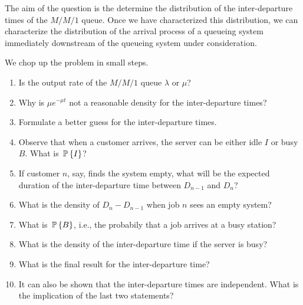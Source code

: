 \begin{question}\label{ex:dep}
  The aim of the question is the determine the distribution of the
  inter-departure times of the $M/M/1$ queue. Once we have
  characterized this distribution, we can characterize the
  distribution of the arrival process of a queueing system
  immediately downstream of the queueing system under
  consideration. 

We chop up the problem in small steps.
  \begin{enumerate}
  \item Is the output rate of the $M/M/1$ queue $\lambda$ or $\mu$?
  \item Why is $\mu e^{-\mu t}$ not a reasonable density for the
    inter-departure times?
  \item Formulate a better guess for the inter-departure times.
  \item Observe that when a customer arrives, the server can be either
    idle $I$ or busy $B$.  What is $\P{I}$?
  \item If customer $n$, say, finds the system empty, what will be the
    expected duration of the inter-departure time between $D_{n-1}$ and
    $D_n$?
  \item What is the density of $D_{n} - D_{n-1}$ when job $n$ sees an
    empty system?
  \item What is $\P{B}$, i.e., the probabily that a job arrives at a
    busy station?
  \item What is the density of the inter-departure time if the
    server is busy?
  \item What is the final result for the inter-departure time?
  \item It can also be shown that the inter-departure times are independent. What is the implication of the last two statements? 

  \end{enumerate}



\end{question}
